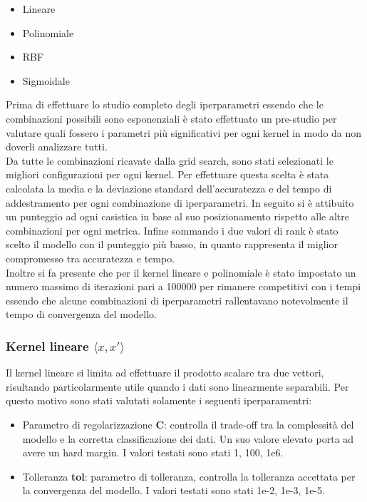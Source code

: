 \begin{itemize}
    \item Lineare
    \item Polinomiale
    \item RBF
    \item Sigmoidale
\end{itemize}

Prima di effettuare lo studio completo degli iperparametri essendo che le 
combinazioni possibili sono esponenziali è stato effettuato un pre-studio
per valutare quali fossero i parametri più significativi per ogni kernel in modo
da non doverli analizzare tutti.\\

Da tutte le combinazioni ricavate dalla grid search, sono stati selezionati le 
migliori configurazioni per ogni kernel. 
Per effettuare questa scelta è stata calcolata la media e la deviazione standard 
dell'accuratezza e del tempo di addestramento per ogni combinazione di iperparametri.
In seguito si è attibuito un punteggio ad ogni casistica in base al suo 
posizionamento rispetto alle altre combinazioni per ogni metrica.
Infine sommando i due valori di rank è stato scelto il modello con il punteggio
più basso, in quanto rappresenta il miglior compromesso tra accuratezza e tempo.\\

Inoltre si fa presente che per il kernel lineare e polinomiale è stato impostato
un numero massimo di iterazioni pari a 100000 per rimanere competitivi con i tempi
essendo che alcune combinazioni di iperparametri rallentavano notevolmente il tempo 
di convergenza del modello.

\subsubsection*{Kernel lineare $\langle x,x'\rangle$}
    Il kernel lineare si limita ad effettuare il prodotto scalare tra due vettori,
    risultando particolarmente utile quando i dati sono linearmente separabili.
    Per questo motivo sono stati valutati solamente i seguenti iperparamentri:
    \begin{itemize}
        \item Parametro di regolarizzazione \textbf{C}: controlla il trade-off tra
              la complessità del modello e la corretta classificazione dei dati.
              Un suo valore elevato porta ad avere un hard margin.
              I valori testati sono stati 1, 100, 1e6.
        \item Tolleranza \textbf{tol}: parametro di tolleranza, controlla la tolleranza
              accettata per la convergenza del modello.
              I valori testati sono stati 1e-2, 1e-3, 1e-5.
    \end{itemize}

